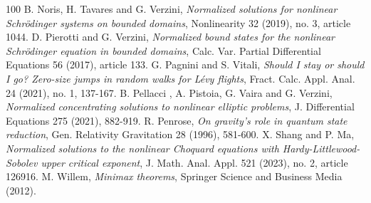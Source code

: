\documentclass[11pt]{article}
\numberwithin{equation}{section}
\numberwithin{mytheorem}{section}
\begin{document}
\begin{thebibliography}{100}
					B. Noris, H. Tavares and G. Verzini, {\it Normalized solutions for nonlinear Schrödinger systems on bounded domains}, Nonlinearity 32 (2019), no. 3, article 1044. 
					 D. Pierotti and G. Verzini, {\it Normalized bound states for the nonlinear Schrödinger equation in bounded domains}, Calc. Var. Partial Differential Equations 56 (2017), article 133.
					 G. Pagnini   and S. Vitali, {\it Should I stay or should I go? Zero-size jumps in random walks for Lévy flights}, Fract. Calc. Appl. Anal. 24 (2021), no. 1, 137-167.
					 B. Pellacci , A. Pistoia, G. Vaira and G. Verzini, {\it Normalized concentrating solutions to nonlinear elliptic problems}, J. Differential Equations 275 (2021), 882-919.
					 R. Penrose, {\it On gravity's role in quantum state reduction}, Gen. Relativity Gravitation 28 (1996), 581-600. 
					 X. Shang and P. Ma, {\it Normalized solutions to the nonlinear Choquard equations with Hardy-Littlewood-Sobolev upper critical exponent}, J. Math. Anal. Appl. 521 (2023), no. 2, article 126916.	
					 M. Willem, {\it Minimax theorems}, Springer Science and Business Media (2012).
				\end{thebibliography}
			
\end{document}
